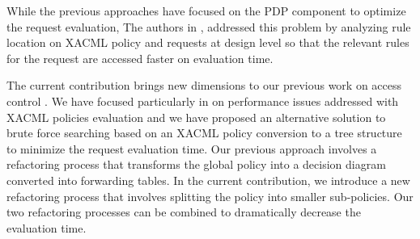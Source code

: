 While the previous approaches have focused on the PDP component to optimize the request evaluation, The authors in 
\cite{XACMLstructure}, addressed this problem by analyzing rule location on XACML policy and requests at design level so that the relevant rules for the request are 
accessed faster on evaluation time. 





The current contribution brings new dimensions to our previous work on access control \cite{Xengine} \cite{testcase} \cite{models}.
We have focused particularly in \cite{Xengine} on performance issues addressed with XACML policies evaluation and we have proposed an 
alternative solution to brute force searching based on an XACML policy conversion to a tree structure to minimize the request evaluation time. 
Our previous approach involves a refactoring process that transforms the global policy into a decision diagram converted into 
forwarding tables. In the current contribution, we introduce a new refactoring process that involves splitting the policy into smaller sub-policies. Our 
two refactoring processes can be combined to dramatically decrease the evaluation time. 
